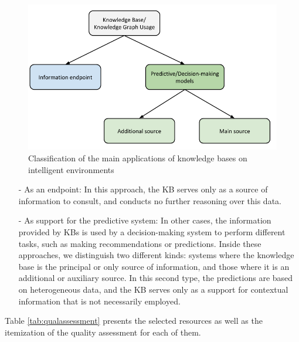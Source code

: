 \begin{figure}[H]
\centering
\includegraphics[width=12cm]{2_stateoftheart/figures/kbusage.png}
\caption{Classification of the main applications of knowledge bases on intelligent environments  \label{fig:taxonomy}}
\end{figure}   


\begin{itemize}     
\item[-] {As an endpoint}: In this approach, the KB serves only as a source of information to consult, and conducts no further reasoning over this data. 
\item[-] {As support for the predictive system}: In other cases, the information provided by KBs is used by a decision-making system to perform different tasks, such as making recommendations or predictions. Inside these approaches, we distinguish two different kinds: systems where the knowledge base is the principal or only source of information, and those where it is an additional or auxiliary source. In this second type, the predictions are based on heterogeneous data, and the KB serves only as a support for contextual information that is not necessarily employed.
\end{itemize}     

Table \ref{tab:qualassessment} presents the selected resources as well as the itemization of the quality assessment for each of them.


